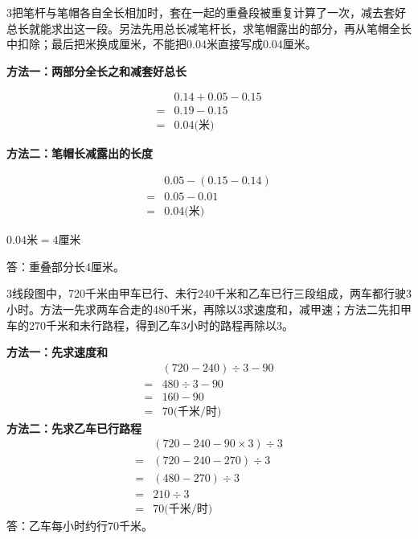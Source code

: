 \documentclass[multi=snippet,border={5bp 20bp 5bp 5bp}]{standalone}
\newenvironment{snippet}[3]{\begin{minipage}{#1bp}\color{answerred}\fontsize{#2}{#3}\selectfont\raggedright}{\end{minipage}}
\begin{document}
\begin{snippet}{505}{11.5}{14}\begin{multicols}{3}\raggedcolumns 把笔杆与笔帽各自全长相加时，套在一起的重叠段被重复计算了一次，减去套好总长就能求出这一段。另法先用总长减笔杆长，求笔帽露出的部分，再从笔帽全长中扣除；最后把米换成厘米，不能把0.04米直接写成0.04厘米。\par \textbf{方法一：两部分全长之和减套好总长}\par\noindent\[\displaystyle \begin{aligned} &0.14+0.05-0.15\\={}&0.19-0.15\\={}&0.04\text{(米)}\end{aligned}\]\par\textbf{方法二：笔帽长减露出的长度}\par\noindent\[\displaystyle \begin{aligned} &0.05-(0.15-0.14)\\={}&0.05-0.01\\={}&0.04\text{(米)}\end{aligned}\]\par \noindent\(\displaystyle 0.04\text{米}=4\text{厘米}\)\allowbreak \par 答：重叠部分长4厘米。\end{multicols}\end{snippet}
\begin{snippet}{505}{11.5}{14}\begin{multicols}{3}\raggedcolumns 线段图中，720千米由甲车已行、未行240千米和乙车已行三段组成，两车都行驶3小时。方法一先求两车合走的480千米，再除以3求速度和，减甲速；方法二先扣甲车的270千米和未行路程，得到乙车3小时的路程再除以3。\par \textbf{方法一：先求速度和}\[\begin{aligned} &(720-240)\div3-90\\={}&480\div3-90\\={}&160-90\\={}&70\text{(千米/时)}\end{aligned}\]\textbf{方法二：先求乙车已行路程}\[\begin{aligned} &(720-240-90\times3)\div3\\={}&(720-240-270)\div3\\={}&(480-270)\div3\\={}&210\div3\\={}&70\text{(千米/时)}\end{aligned}\]答：乙车每小时约行70千米。\end{multicols}\end{snippet}
\end{document}
